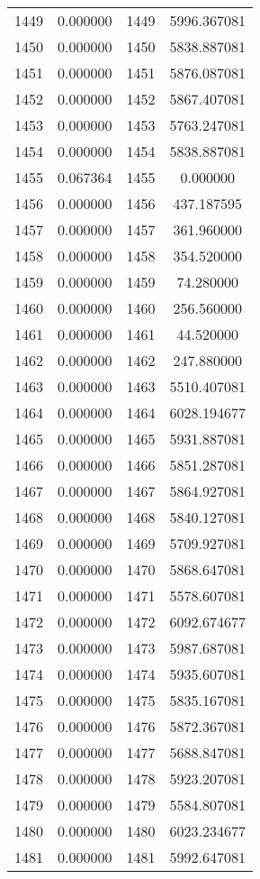 \documentclass[12pt]{article}
\begin{document}
\begin{longtable}{@{}cccc@{}}
1449 & 0.000000 & 1449 & 5996.367081 \\
1450 & 0.000000 & 1450 & 5838.887081 \\
1451 & 0.000000 & 1451 & 5876.087081 \\
1452 & 0.000000 & 1452 & 5867.407081 \\
1453 & 0.000000 & 1453 & 5763.247081 \\
1454 & 0.000000 & 1454 & 5838.887081 \\
1455 & 0.067364 & 1455 & 0.000000 \\
1456 & 0.000000 & 1456 & 437.187595 \\
1457 & 0.000000 & 1457 & 361.960000 \\
1458 & 0.000000 & 1458 & 354.520000 \\
1459 & 0.000000 & 1459 & 74.280000 \\
1460 & 0.000000 & 1460 & 256.560000 \\
1461 & 0.000000 & 1461 & 44.520000 \\
1462 & 0.000000 & 1462 & 247.880000 \\
1463 & 0.000000 & 1463 & 5510.407081 \\
1464 & 0.000000 & 1464 & 6028.194677 \\
1465 & 0.000000 & 1465 & 5931.887081 \\
1466 & 0.000000 & 1466 & 5851.287081 \\
1467 & 0.000000 & 1467 & 5864.927081 \\
1468 & 0.000000 & 1468 & 5840.127081 \\
1469 & 0.000000 & 1469 & 5709.927081 \\
1470 & 0.000000 & 1470 & 5868.647081 \\
1471 & 0.000000 & 1471 & 5578.607081 \\
1472 & 0.000000 & 1472 & 6092.674677 \\
1473 & 0.000000 & 1473 & 5987.687081 \\
1474 & 0.000000 & 1474 & 5935.607081 \\
1475 & 0.000000 & 1475 & 5835.167081 \\
1476 & 0.000000 & 1476 & 5872.367081 \\
1477 & 0.000000 & 1477 & 5688.847081 \\
1478 & 0.000000 & 1478 & 5923.207081 \\
1479 & 0.000000 & 1479 & 5584.807081 \\
1480 & 0.000000 & 1480 & 6023.234677 \\
1481 & 0.000000 & 1481 & 5992.647081 \\

\end{longtable}
\end{document}

